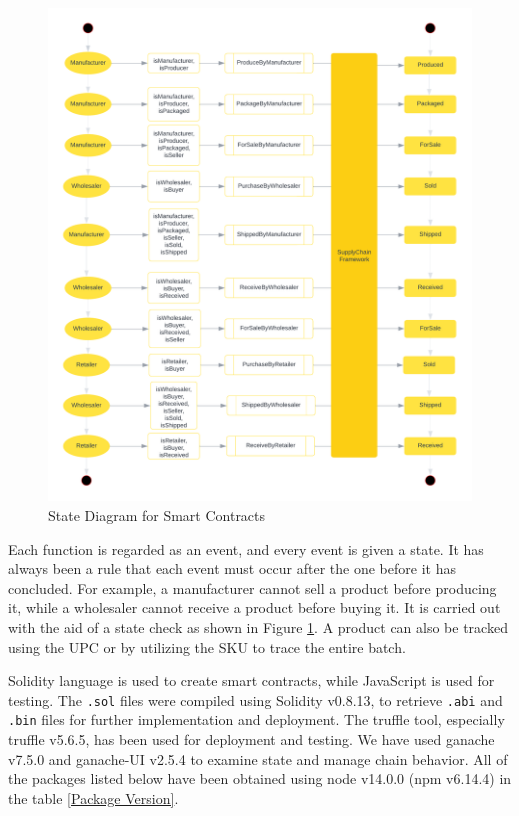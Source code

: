 \vspace{.5cm}

   \begin{figure}[h]
    \centering
      \includegraphics[width=\linewidth]{includes/figures/State diagram.png} 
      \caption{State Diagram for Smart Contracts}
      \label{State Diagram}
    \end{figure}

\vspace{.5cm}

Each function is regarded as an event, and every event is given a state. It has always been a rule that each event must occur after the one before it has concluded. For example, a manufacturer cannot sell a product before producing it, while a wholesaler cannot receive a product before buying it. It is carried out with the aid of a state check as shown in Figure \ref{State Diagram}. A product can also be tracked using the \ac{UPC} or by utilizing the \ac{SKU} to trace the entire batch.

\vspace{.5cm}

Solidity language is used to create smart contracts, while JavaScript is used for testing. The \texttt{.sol} files were compiled using Solidity v0.8.13, to retrieve \texttt{.abi} and \texttt{.bin} files for further implementation and deployment. The truffle tool, especially truffle v5.6.5, has been used for deployment and testing. We have used ganache v7.5.0 and ganache-UI v2.5.4 to examine state and manage chain behavior. All of the packages listed below have been obtained using node v14.0.0 (npm v6.14.4) in the table \ref{Package Version}.
    

